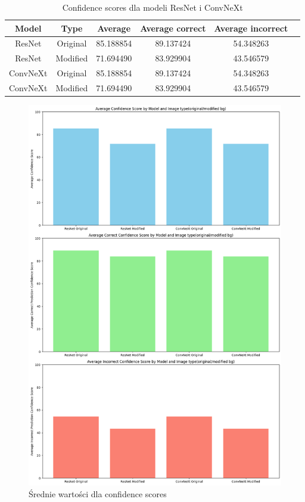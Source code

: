 \begin{table}
	\centering
	\begin{tabular}{|c|c|c|c|c|c|}
		\hline
		\textbf{Model} & \textbf{Type} & \textbf{Average} & 
		\textbf{Average correct} & \textbf{Average incorrect} \\
		\hline
		ResNet & Original & 85.188854 & 89.137424 & 54.348263 \\
		\hline
		ResNet & Modified & 71.694490 & 83.929904 & 43.546579  \\
		\hline
		ConvNeXt & Original & 85.188854 & 89.137424 & 54.348263 \\
		\hline
		ConvNeXt & Modified & 71.694490 & 83.929904 & 43.546579 \\
		\hline
	\end{tabular}
	\caption{Confidence scores dla modeli ResNet i ConvNeXt}
	\label{tab:model_confidence}
\end{table}

\begin{figure}
	\centering\includegraphics[width=.9\textwidth]{img/confidence_avg}
	\caption{Średnie wartości dla confidence scores}  
    \label{rys:confidence_avg}
\end{figure}


